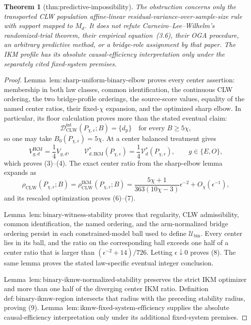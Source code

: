 \documentclass{article}
\newtheorem{theorem}{Theorem}
\begin{document}
\begin{theorem}[thm:predictive-impossibility]
The obstruction concerns only the transported CLW population affine-linear residual-variance-over-sample-size rule with support mapped to \(M_d\). It does not refute Carneiro--Lee--Wilhelm's randomized-trial theorem, their empirical equation~(3.6), their OGA procedure, an arbitrary predictive method, or a bridge-role assignment by that paper. The IKM profile has its absolute causal-efficiency interpretation only under the separately cited fixed-system premises.
\end{theorem}
\begin{proof}
Lemma~\(\mathrm{lem{:}sharp\text{-}uniform\text{-}binary\text{-}elbow}\) proves every center assertion: membership in both law classes, common identification, the continuous CLW ordering, the two bridge-profile orderings, the source-score values, equality of the named center ratios, their fixed-\(\chi\) expansion, and the optimized sharp elbow.  In particular, its floor calculation proves more than the stated eventual claim:
\[
 \mathcal D_{\mathrm{CLW}}^{\mathrm{int}}(P_{\chi,\epsilon};B)
 =\{d_{\mathrm p}\}
 \quad\text{for every }B\ge5\chi,
\]
so one may take \(B_0(P_{\chi,\epsilon})=5\chi\).  At a center balanced treatment gives
\[
 V_{g,d}^{\mathrm{IKM}}=\frac14V_{g,d},
 \qquad
 \mathcal V_{d,\mathrm{IKM}}^*(P_{\chi,\epsilon})
 =\frac14\mathcal V_d^*(P_{\chi,\epsilon}),
 \qquad g\in\{E,O\},                                    \tag{37}
\]
which proves (3)--(4).  The exact center ratio from the sharp-elbow lemma expands as
\[
 \rho_{\mathrm{CLW}}(P_{\chi,\epsilon};B)
 =\rho_{\mathrm{CLW}}^{\mathrm{IKM}}(P_{\chi,\epsilon};B)
 =\frac{5\chi+1}{363(10\chi-3)}\epsilon^{-2}
 +O_\chi(\epsilon^{-1}),
\]
and its rescaled optimization proves (6)--(7).

Lemma~\(\mathrm{lem{:}binary\text{-}witness\text{-}stability}\) proves that regularity, CLW admissibility, common identification, the named ordering, and the arm-normalized bridge ordering persist in each constrained-model ball used to define \(\mathcal U_{\mathrm{bin}}\).  Every center lies in its ball, and the ratio on the corresponding ball exceeds one half of a center ratio that is larger than \((\epsilon^{-2}+14)/726\).  Letting \(\epsilon\downarrow0\) proves (8).  The same lemma proves the stated law-specific eventual integer conclusion.

Lemma~\(\mathrm{lem{:}binary\text{-}ikmw\text{-}normalized\text{-}stability}\) preserves the strict IKM optimizer and more than one half of the diverging center IKM ratio.  Definition~\(\mathrm{def{:}binary\text{-}ikmw\text{-}region}\) intersects that radius with the preceding stability radius, proving (9).  Lemma~\(\mathrm{lem{:}ikmw\text{-}fixed\text{-}system\text{-}efficiency}\) supplies the absolute causal-efficiency interpretation only under its additional fixed-system premises.


\end{proof}
\end{document}
